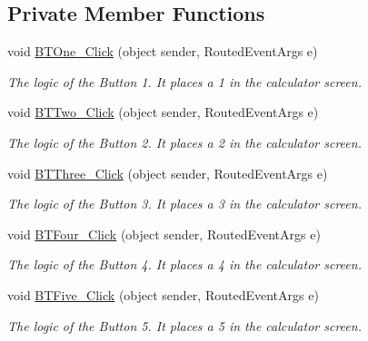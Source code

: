 \subsection*{Private Member Functions}
\begin{DoxyCompactItemize}
\item 
void \mbox{\hyperlink{class_p_a_c4_______calculadora_1_1_main_window_a735514cee2ee8d58f89d9b2f8d9d49f1}{B\+T\+One\+\_\+\+Click}} (object sender, Routed\+Event\+Args e)
\begin{DoxyCompactList}\small\item\em The logic of the Button 1. It places a 1 in the calculator screen. \end{DoxyCompactList}\item 
void \mbox{\hyperlink{class_p_a_c4_______calculadora_1_1_main_window_a3415f36851e68edf5322a836d57f4d22}{B\+T\+Two\+\_\+\+Click}} (object sender, Routed\+Event\+Args e)
\begin{DoxyCompactList}\small\item\em The logic of the Button 2. It places a 2 in the calculator screen. \end{DoxyCompactList}\item 
void \mbox{\hyperlink{class_p_a_c4_______calculadora_1_1_main_window_a8f8aa1b9eac466368afb1fedaf388113}{B\+T\+Three\+\_\+\+Click}} (object sender, Routed\+Event\+Args e)
\begin{DoxyCompactList}\small\item\em The logic of the Button 3. It places a 3 in the calculator screen. \end{DoxyCompactList}\item 
void \mbox{\hyperlink{class_p_a_c4_______calculadora_1_1_main_window_ab34ce4e048c77bc5963e10f37f8d2332}{B\+T\+Four\+\_\+\+Click}} (object sender, Routed\+Event\+Args e)
\begin{DoxyCompactList}\small\item\em The logic of the Button 4. It places a 4 in the calculator screen. \end{DoxyCompactList}\item 
void \mbox{\hyperlink{class_p_a_c4_______calculadora_1_1_main_window_a4d6c73da40604b904949848d8c1aa7ec}{B\+T\+Five\+\_\+\+Click}} (object sender, Routed\+Event\+Args e)
\begin{DoxyCompactList}\small\item\em The logic of the Button 5. It places a 5 in the calculator screen. \end{DoxyCompactList}\item 

\end{DoxyCompactItemize}
